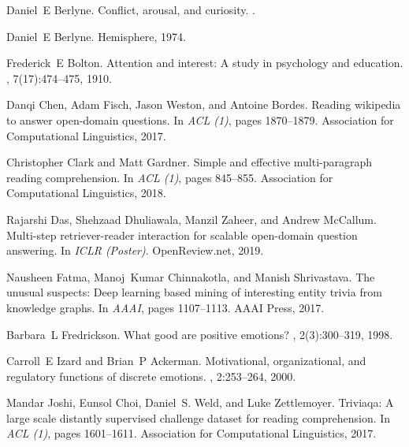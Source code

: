 \documentclass[11pt]{article}
\begin{document}
\begin{thebibliography}{10}

Daniel~E Berlyne.
\newblock Conflict, arousal, and curiosity.
.

Daniel~E Berlyne.
\newblock Hemisphere, 1974.

Frederick~E Bolton.
\newblock Attention and interest: A study in psychology and education.
, 7(17):474--475, 1910.

Danqi Chen, Adam Fisch, Jason Weston, and Antoine Bordes.
\newblock Reading wikipedia to answer open-domain questions.
\newblock In {\em {ACL} {(1)}}, pages 1870--1879. Association for Computational Linguistics, 2017.

Christopher Clark and Matt Gardner.
\newblock Simple and effective multi-paragraph reading comprehension.
\newblock In {\em {ACL} {(1)}}, pages 845--855. Association for Computational Linguistics, 2018.

Rajarshi Das, Shehzaad Dhuliawala, Manzil Zaheer, and Andrew McCallum.
\newblock Multi-step retriever-reader interaction for scalable open-domain question answering.
\newblock In {\em {ICLR} (Poster)}. OpenReview.net, 2019.

Nausheen Fatma, Manoj~Kumar Chinnakotla, and Manish Shrivastava.
\newblock The unusual suspects: Deep learning based mining of interesting entity trivia from knowledge graphs.
\newblock In {\em {AAAI}}, pages 1107--1113. {AAAI} Press, 2017.

Barbara~L Fredrickson.
\newblock What good are positive emotions?
, 2(3):300--319, 1998.

Carroll~E Izard and Brian~P Ackerman.
\newblock Motivational, organizational, and regulatory functions of discrete emotions.
, 2:253--264, 2000.

Mandar Joshi, Eunsol Choi, Daniel~S. Weld, and Luke Zettlemoyer.
\newblock Triviaqa: {A} large scale distantly supervised challenge dataset for reading comprehension.
\newblock In {\em {ACL} {(1)}}, pages 1601--1611. Association for Computational Linguistics, 2017.


\end{thebibliography}
\end{document}
